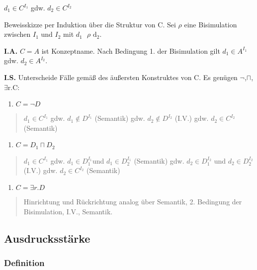$d_{1} \in C^{I_{1}}$ gdw. $d_{2} \in C^{I_{2}}$

Beweisskizze per Induktion über die Struktur von C. Sei $\rho$ eine
Bisimulation zwischen $I_{1}$ und $I_{2}$ mit
$d_{1}\text{\ $\rho$}\text{\ d}_{2}$.

\textbf{I.A.} $C = A$ ist Konzeptname. Nach Bedingung 1. der
Bisimulation gilt $d_{1} \in A^{I_{1}}$ gdw. $d_{2} \in A^{I_{2}}$.

\textbf{I.S.} Unterscheide Fälle gemäß des äußersten Konstruktes von C.
Es genügen $\neg$,$\sqcap$, $\exists\text{r.C}$:

\begin{enumerate}
\def\labelenumi{\arabic{enumi}.}
\item
  $C = \neg D$
\end{enumerate}

\begin{quote}
$d_{1} \in C^{I_{1}}$ gdw. $d_{1} \notin D^{I_{1}}$ (Semantik) gdw.
$d_{2} \notin D^{I_{2}}$ (I.V.) gdw. $d_{2} \in C^{I_{2}}$
(Semantik)
\end{quote}

\begin{enumerate}
\def\labelenumi{\arabic{enumi}.}
\item
  $C = D_{1} \sqcap D_{2}$
\end{enumerate}

\begin{quote}
$d_{1} \in C^{I_{1}}$ gdw. $d_{1} \in D_{1}^{I_{1}}$und
$d_{1} \in D_{2}^{I_{1}}$ (Semantik) gdw. $d_{2} \in D_{1}^{I_{2}}$
und $d_{2} \in D_{2}^{I_{2}}$ (I.V.) gdw. $d_{2} \in C^{I_{2}}$
(Semantik)
\end{quote}

\begin{enumerate}
\def\labelenumi{\arabic{enumi}.}
\item
  $C = \exists r.D$
\end{enumerate}

\begin{quote}
Hinrichtung und Rückrichtung analog über Semantik, 2. Bedingung der
Bisimulation, I.V., Semantik.
\end{quote}

\subsection{Ausdrucksstärke}\label{ausdrucksstuxe4rke}

\subsubsection{Definition}\label{definition-3}

